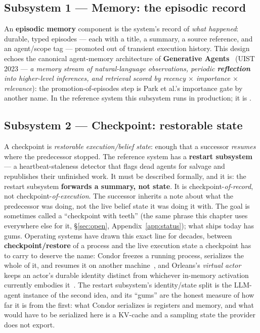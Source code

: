 \documentclass[11pt,a4paper]{article}
\theoremstyle{definition}
\begin{document}
\subsection{Subsystem 1 --- Memory: the episodic record \quad\BUILT}

An \textbf{episodic memory} component is the system's record of \emph{what
happened}: durable, typed episodes --- each with a title, a summary, a source
reference, and an agent/scope tag --- promoted out of transient execution history.
This design echoes the canonical agent-memory architecture of \textbf{Generative
Agents}~ (UIST 2023 --- \emph{a memory stream of
natural-language observations, periodic \textbf{reflection} into higher-level
inferences, and retrieval scored by recency $\times$ importance $\times$
relevance}): the promotion-of-episodes step is Park et al.'s importance gate by
another name. In the reference system this subsystem runs in production; it is
\BUILT.

\subsection{Subsystem 2 --- Checkpoint: restorable state \quad\BUILTWEAK}

A checkpoint is \emph{restorable execution/belief state}: enough that a successor
\emph{resumes} where the predecessor stopped. The reference system has a
\textbf{restart subsystem} --- a heartbeat-staleness detector that flags dead agents
for salvage and republishes their unfinished work. It must be described formally,
and it is: the restart subsystem \textbf{forwards a summary, not state}. It is
checkpoint-\emph{of-record}, not checkpoint-\emph{of-execution}. The successor
inherits a note about what the predecessor was doing, not the live belief state it
was doing it with. The goal is sometimes called a ``checkpoint with teeth''
(the same phrase this chapter uses everywhere else for it, \S\ref{sec:open},
Appendix~\ref{app:status}); what ships today has gums. Operating systems have
drawn this exact line for decades, between \textbf{checkpoint/restore} of a
process and the live execution state a checkpoint has to carry to deserve the
name: Condor freezes a running process, serializes the whole of it, and resumes
it on another machine~, and Orleans's \emph{virtual
actor} keeps an actor's durable identity distinct from whichever in-memory
activation currently embodies it~. The restart
subsystem's identity/state split is the LLM-agent instance of the second idea, and
its ``gums'' are the honest measure of how far it is from the first: what
Condor serializes is registers and memory, and what would have to be serialized
here is a KV-cache and a sampling state the provider does not export.
\end{document}
